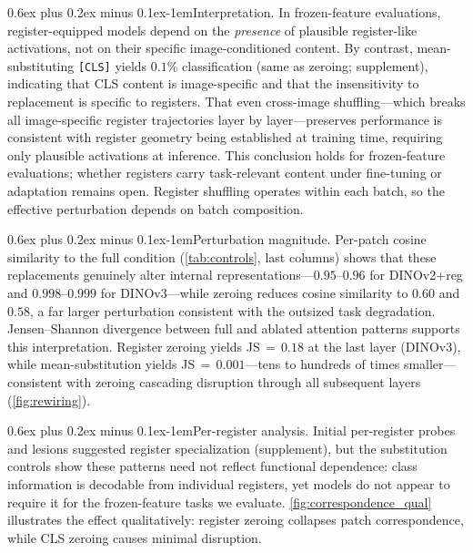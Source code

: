 \documentclass[10pt,twocolumn,letterpaper]{article}
\makeatletter
\renewcommand{\paragraph}{\@startsection{paragraph}{4}{\z@}%
  {0.6ex plus 0.2ex minus 0.1ex}{-1em}{\normalfont\normalsize\bfseries}}
\makeatother
\begin{document}
\paragraph{Interpretation.}
In frozen-feature evaluations, register-equipped models depend on the \emph{presence} of plausible register-like activations, not on their specific image-conditioned content.
By contrast, mean-substituting \texttt{[CLS]} yields $0.1\%$ classification (same as zeroing; supplement), indicating that CLS content is image-specific and that the insensitivity to replacement is specific to registers.
That even cross-image shuffling---which breaks all image-specific register trajectories layer by layer---preserves performance is consistent with register geometry being established at training time, requiring only plausible activations at inference.
This conclusion holds for frozen-feature evaluations; whether registers carry task-relevant content under fine-tuning or adaptation remains open.
Register shuffling operates within each batch, so the effective perturbation depends on batch composition.

\paragraph{Perturbation magnitude.}
Per-patch cosine similarity to the full condition (\cref{tab:controls}, last columns) shows that these replacements genuinely alter internal representations---$0.95$--$0.96$ for DINOv2+reg and $0.998$--$0.999$ for DINOv3---while zeroing reduces cosine similarity to $0.60$ and $0.58$, a far larger perturbation consistent with the outsized task degradation.
Jensen--Shannon divergence between full and ablated attention patterns supports this interpretation. Register zeroing yields JS\,$=$\,$0.18$ at the last layer (DINOv3), while mean-substitution yields JS\,$=$\,$0.001$---tens to hundreds of times smaller---consistent with zeroing cascading disruption through all subsequent layers (\cref{fig:rewiring}).

\paragraph{Per-register analysis.}
Initial per-register probes and lesions suggested register specialization (supplement), but the substitution controls show these patterns need not reflect functional dependence: class information is decodable from individual registers, yet models do not appear to require it for the frozen-feature tasks we evaluate.
\cref{fig:correspondence_qual} illustrates the effect qualitatively: register zeroing collapses patch correspondence, while CLS zeroing causes minimal disruption.
\end{document}

